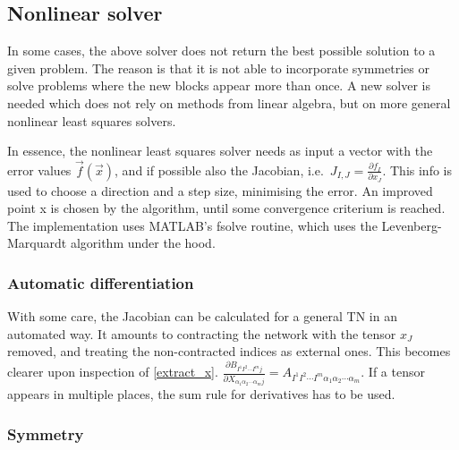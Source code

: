 \subsection{Nonlinear solver}

In some cases, the above solver does not return the best possible solution to a given problem. The reason is that it is not able to incorporate symmetries or solve problems where the new blocks appear more than once. A new solver is needed which does not rely on methods from linear algebra, but on more general nonlinear least squares solvers.

In essence, the nonlinear least squares solver needs as input a vector with the error values $\vec{f}( \vec{x} )$, and if possible also the Jacobian, i.e.\ $ J_{I,J}  = \frac{ \partial f_I }{ \partial x_J } $. This info is used to choose a direction and a step size, minimising the error. An improved point x is chosen by the algorithm, until some convergence criterium is reached. The implementation uses MATLAB's fsolve routine, which uses the Levenberg-Marquardt algorithm under the hood.

\subsubsection{Automatic differentiation}
With some care, the Jacobian can be calculated for a general \Gls{TN} in an automated way. It amounts to  contracting the network with the tensor $x_J$ removed, and treating the non-contracted indices as external ones. This becomes clearer upon inspection of \cref{extract_x}. $  \frac{ \partial B_{I^1 I^2 \cdots I^m  j } }{  \partial X_{\alpha_1 \alpha_2 \cdots \alpha_m j } } =  A_{I^1 I^2 \cdots I^m  \alpha_1 \alpha_2 \cdots \alpha_m }{}$. If a tensor appears in multiple places, the sum rule for derivatives has to be used.


\subsubsection{Symmetry}


